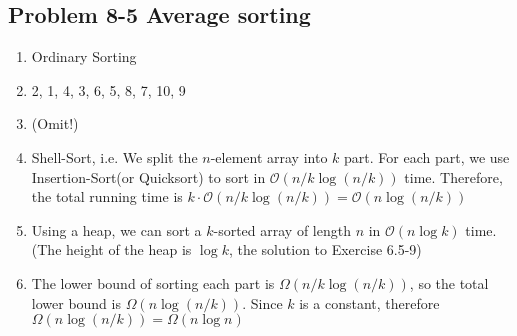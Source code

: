 \subsection*{Problem 8-5 Average sorting}
\begin{enumerate}
	\item	Ordinary Sorting
	\item	2, 1, 4, 3, 6, 5, 8, 7, 10, 9
	\item	(Omit!)
	\item	Shell-Sort, i.e. We split the $n$-element array into $k$ part. For each part, we use Insertion-Sort(or Quicksort) to sort in $\mathcal{O}(n / k \log (n / k))$ time. Therefore, the total running time is $k \cdot \mathcal{O}(n / k \log (n / k)) = \mathcal{O}(n \log (n / k))$
	\item	Using a heap, we can sort a $k$-sorted array of length $n$ in $\mathcal{O}(n \log k)$ time. \\
		(The height of the heap is $\log k$, the solution to Exercise 6.5-9)
	\item	The lower bound of sorting each part is $\Omega(n / k \log (n / k))$, so the total lower bound is $\Omega(n \log (n / k))$. Since $k$ is a constant, therefore $\Omega(n \log (n / k)) = \Omega(n \log n)$
\end{enumerate}

